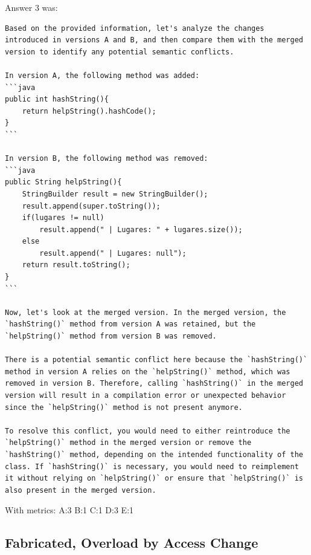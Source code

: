 Answer 3 was:
\begin{lstlisting}
Based on the provided information, let's analyze the changes introduced in versions A and B, and then compare them with the merged version to identify any potential semantic conflicts.

In version A, the following method was added:
```java
public int hashString(){
    return helpString().hashCode();
}
```

In version B, the following method was removed:
```java
public String helpString(){
    StringBuilder result = new StringBuilder();
    result.append(super.toString());
    if(lugares != null)
        result.append(" | Lugares: " + lugares.size());
    else
        result.append(" | Lugares: null");
    return result.toString();
}
```

Now, let's look at the merged version. In the merged version, the `hashString()` method from version A was retained, but the `helpString()` method from version B was removed.

There is a potential semantic conflict here because the `hashString()` method in version A relies on the `helpString()` method, which was removed in version B. Therefore, calling `hashString()` in the merged version will result in a compilation error or unexpected behavior since the `helpString()` method is not present anymore.

To resolve this conflict, you would need to either reintroduce the `helpString()` method in the merged version or remove the `hashString()` method, depending on the intended functionality of the class. If `hashString()` is necessary, you would need to reimplement it without relying on `helpString()` or ensure that `helpString()` is also present in the merged version.
\end{lstlisting}

With metrics:
A:3
B:1
C:1
D:3
E:1

\subsection{Fabricated, Overload by Access Change}

